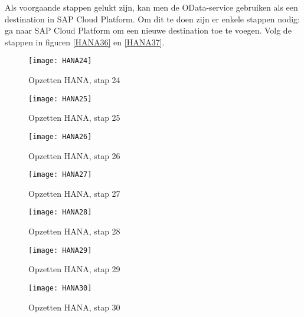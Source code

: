             Als voorgaande stappen gelukt zijn, kan men de OData-service gebruiken als een destination in SAP Cloud Platform. Om dit te doen zijn er enkele stappen nodig: ga naar SAP Cloud Platform om een nieuwe destination toe te voegen. Volg de stappen in figuren \ref{HANA36} en \ref{HANA37}.
            
            
            \begin{figure}	
                \centering
                \texttt{[image: HANA24]}
                \caption{Opzetten HANA, stap 24} \label{HANA24}
            \end{figure}
            
            \begin{figure}	
                \centering
                \texttt{[image: HANA25]}
                \caption{Opzetten HANA, stap 25} \label{HANA25}
            \end{figure}
            
            \begin{figure}	
                \centering
                \texttt{[image: HANA26]}
                \caption{Opzetten HANA, stap 26} \label{HANA26}
            \end{figure}
            
            \begin{figure}	
                \centering
                \texttt{[image: HANA27]}
                \caption{Opzetten HANA, stap 27} \label{HANA27}
            \end{figure}
            
            \begin{figure}	
                \centering
                \texttt{[image: HANA28]}
                \caption{Opzetten HANA, stap 28} \label{HANA28}
            \end{figure}
            
            \begin{figure}	
                \centering
                \texttt{[image: HANA29]}
                \caption{Opzetten HANA, stap 29} \label{HANA29}
            \end{figure}
        
            \begin{figure}	
                \centering
                \texttt{[image: HANA30]}
                \caption{Opzetten HANA, stap 30} \label{HANA30}
            \end{figure}
            
